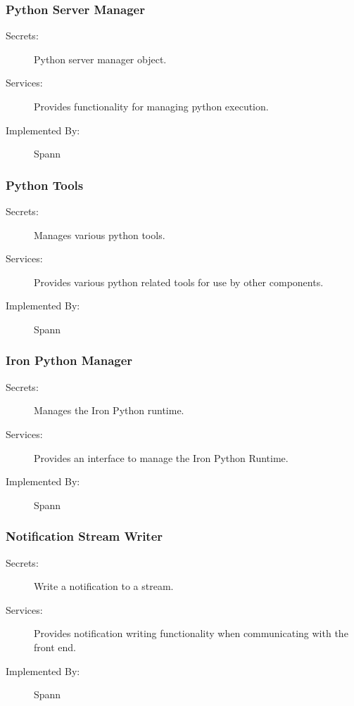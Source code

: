\documentclass[12pt, titlepage]{article}
\begin{document}
\subsubsection{Python Server Manager}

\begin{description}
\item[Secrets:] Python server manager object.
\item[Services:] Provides functionality for managing python execution.
\item[Implemented By:] Spann
\end{description}


\subsubsection{Python Tools}

\begin{description}
\item[Secrets:] Manages various python tools.
\item[Services:] Provides various python related tools for use by other components.
\item[Implemented By:] Spann
\end{description}


\subsubsection{Iron Python Manager}

\begin{description}
\item[Secrets:] Manages the Iron Python runtime.
\item[Services:] Provides an interface to manage the Iron Python Runtime.
\item[Implemented By:] Spann
\end{description}

\subsubsection{Notification Stream Writer}

\begin{description}
\item[Secrets:] Write a notification to a stream.
\item[Services:] Provides notification writing functionality when communicating
    with the front end.
\item[Implemented By:] Spann
\end{description}
\end{document}
